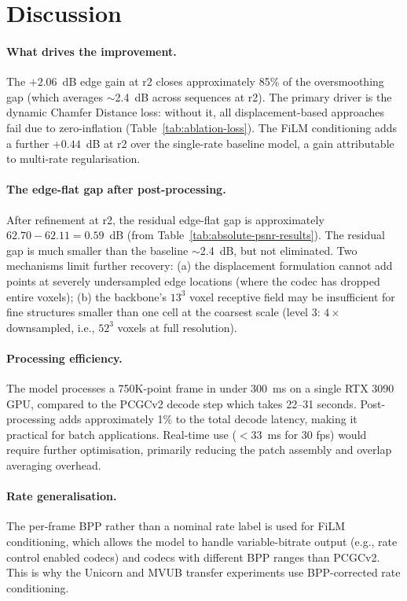 \section{Discussion}
\label{sec:discussion}

\paragraph{What drives the improvement.}
The $+2.06$~dB edge gain at r2 closes approximately 85\% of the
oversmoothing gap (which averages $\sim$2.4~dB across sequences at r2).
The primary driver is the dynamic Chamfer Distance loss: without it,
all displacement-based approaches fail due to zero-inflation (Table~\ref{tab:ablation-loss}).
The FiLM conditioning adds a further $+0.44$~dB at r2 over the single-rate
baseline model, a gain attributable to multi-rate regularisation.

\paragraph{The edge-flat gap after post-processing.}
After refinement at r2, the residual edge-flat gap is approximately
$62.70 - 62.11 = 0.59$~dB (from Table~\ref{tab:absolute-psnr-results}).
The residual gap is much smaller than the baseline $\sim$2.4~dB,
but not eliminated.
Two mechanisms limit further recovery:
(a) the displacement formulation cannot add points at severely undersampled
edge locations (where the codec has dropped entire voxels);
(b) the backbone's $13^3$ voxel receptive field may be insufficient for
fine structures smaller than one cell at the coarsest scale (level 3: $4\times$
downsampled, i.e., $52^3$ voxels at full resolution).

\paragraph{Processing efficiency.}
The model processes a 750K-point frame in under 300~ms on a single RTX 3090 GPU,
compared to the PCGCv2 decode step which takes 22--31 seconds.
Post-processing adds approximately 1\% to the total decode latency,
making it practical for batch applications.
Real-time use ($< 33$~ms for 30 fps) would require further optimisation,
primarily reducing the patch assembly and overlap averaging overhead.

\paragraph{Rate generalisation.}
The per-frame BPP rather than a nominal rate label is used for FiLM
conditioning, which allows the model to handle variable-bitrate output
(e.g., rate control enabled codecs) and codecs with different BPP ranges
than PCGCv2.
This is why the Unicorn and MVUB transfer experiments use BPP-corrected
rate conditioning.
